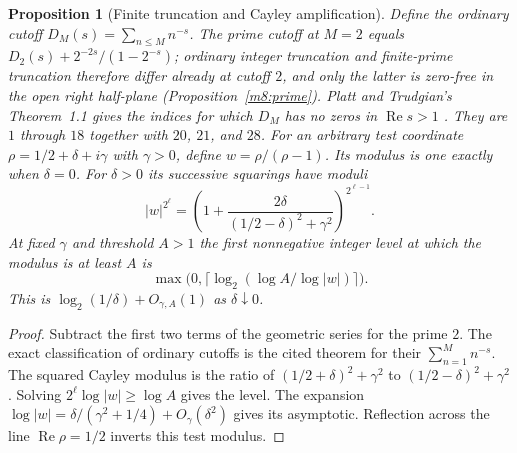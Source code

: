 \documentclass[11pt,reqno]{amsart}
\newtheorem{proposition}[theorem]{Proposition}
\theoremstyle{definition}
\theoremstyle{remark}
\numberwithin{equation}{section}
\begin{document}
\begin{proposition}[Finite truncation and Cayley amplification]\label{m8:finite}
Define the ordinary cutoff $D_M(s)=\sum_{n\le M}n^{-s}$.
The prime cutoff at $M=2$ equals $D_2(s)+2^{-2s}/(1-2^{-s})$; ordinary integer truncation and finite-prime truncation therefore differ
already at cutoff $2$, and only the latter is zero-free in the open right half-plane (Proposition~\ref{m8:prime}). Platt and Trudgian's
Theorem~1.1 gives the indices for which $D_M$ has no zeros in
$\operatorname{Re}s>1$ \cite{m8:platt}. They are $1$ through $18$
together with $20$, $21$, and $28$. For an arbitrary test coordinate
$\rho=1/2+\delta+i\gamma$ with $\gamma>0$, define
$w=\rho/(\rho-1)$. Its modulus is one exactly when $\delta=0$.
For $\delta>0$ its successive squarings have moduli
\[
 |w|^{2^\ell}
   =\left(1+\frac{2\delta}{(1/2-\delta)^2+\gamma^2}\right)^{2^{\ell-1}}.
\]
At fixed $\gamma$ and threshold $A>1$ the first nonnegative
integer level at which the modulus is at least $A$ is
\[
 \max\bigl(0,\lceil\log_2(\log A/\log |w|)\rceil\bigr).
\]
This is $\log_2(1/\delta)+O_{\gamma,A}(1)$ as $\delta\downarrow0$.
\end{proposition}
\begin{proof}
Subtract the first two terms of the geometric series for the
prime $2$. The exact classification of ordinary cutoffs is the
cited theorem for their $\sum_{n=1}^M n^{-s}$. The squared
Cayley modulus is the ratio of
$(1/2+\delta)^2+\gamma^2$ to $(1/2-\delta)^2+\gamma^2$.
Solving $2^\ell\log |w|\ge\log A$ gives the level.
The expansion $\log |w|=\delta/(\gamma^2+1/4)+O_\gamma(\delta^2)$
gives its asymptotic. Reflection across the line
$\operatorname{Re}\rho=1/2$ inverts this test modulus.
\end{proof}
\end{document}

